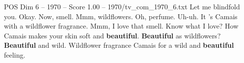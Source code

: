 \begin{textsample}{POS Dim 6 – 1970 – Score 1.00 – 1970/tv\_com\_1970\_6.txt}  \label{ex:f6_pos_037}
Let me blindfold you.
Okay.
Now, smell.
Mmm, wildflowers.
Oh, perfume.
Uh-uh.
It 's Camais with a wildflower fragrance.
Mmm, I love that smell.
Know what I love?
How Camais makes your skin soft and \textbf{beautiful}. \textbf{Beautiful} as wildflowers? \textbf{Beautiful} and wild.
Wildflower fragrance Camais for a wild and \textbf{beautiful} feeling.

\end{textsample}
